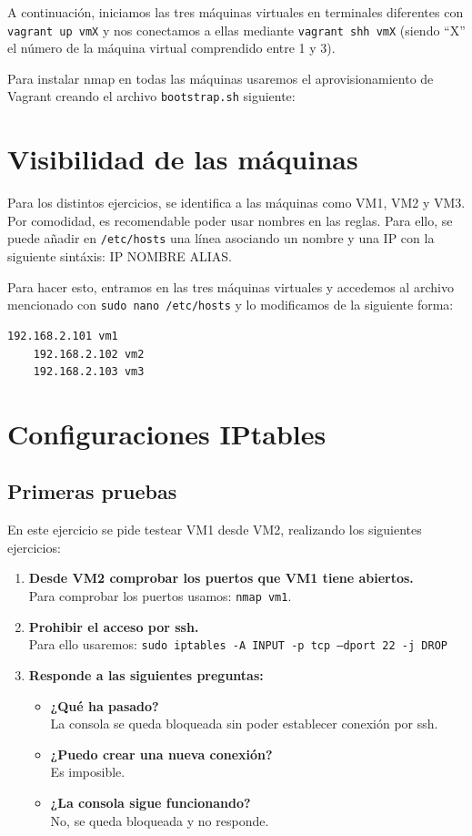 \documentclass[12pt,letterpaper]{article}
\begin{document}
A continuación, iniciamos las tres máquinas virtuales en terminales diferentes con \texttt{vagrant up vmX} y nos conectamos a ellas mediante \texttt{vagrant shh vmX} (siendo ``X'' el número de la máquina virtual comprendido entre 1 y 3).

Para instalar nmap en todas las máquinas usaremos el aprovisionamiento de Vagrant creando el archivo \texttt{bootstrap.sh} siguiente:


\section{Visibilidad de las máquinas}
Para los distintos ejercicios, se identifica a las máquinas como VM1, VM2 y VM3. Por comodidad, es recomendable poder usar nombres en las reglas. Para ello, se puede añadir en \texttt{/etc/hosts} una línea asociando un nombre y una IP con la siguiente sintáxis: IP NOMBRE ALIAS.

Para hacer esto, entramos en las tres máquinas virtuales y accedemos al archivo mencionado con \texttt{sudo nano /etc/hosts} y lo modificamos de la siguiente forma:
\begin{lstlisting}[language=Bash]
	192.168.2.101 vm1
	192.168.2.102 vm2
	192.168.2.103 vm3
\end{lstlisting}

\section{Configuraciones IPtables}
\subsection{Primeras pruebas}
En este ejercicio se pide testear VM1 desde VM2, realizando los siguientes ejercicios:
\begin{enumerate}
	\item \textbf{Desde VM2 comprobar los puertos que VM1 tiene abiertos.} \\
	Para comprobar los puertos usamos: \texttt{nmap vm1}.
	\item \textbf{Prohibir el acceso por ssh.} \\
	Para ello usaremos: \texttt{sudo iptables -A INPUT -p tcp ---dport 22 -j DROP}
	\item \textbf{Responde a las siguientes preguntas:}
	\begin{itemize}
		\item \textbf{¿Qué ha pasado?} \\
		La consola se queda bloqueada sin poder establecer conexión por ssh.
		\item \textbf{¿Puedo crear una nueva conexión?} \\
		Es imposible.
		\item \textbf{¿La consola sigue funcionando?} \\
		No, se queda bloqueada y no responde.
	\end{itemize}
\end{enumerate}
\end{document}
